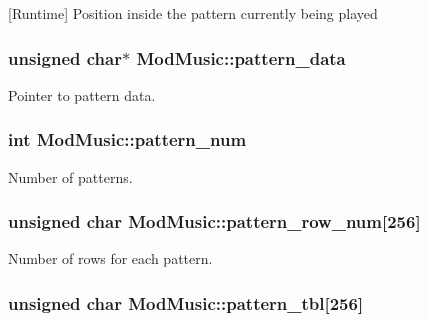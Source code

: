 \mbox{[}Runtime\mbox{]} Position inside the pattern currently being played 

\hypertarget{structModMusic_a4f279f645c007e434d897b480510e748}{}
\subsubsection[{pattern\+\_\+data}]{\setlength{\rightskip}{0pt plus 5cm}unsigned char$\ast$ Mod\+Music\+::pattern\+\_\+data}\label{structModMusic_a4f279f645c007e434d897b480510e748}


Pointer to pattern data. 

\hypertarget{structModMusic_a94311ad25e92db0711cc9dfb5f25103d}{}
\subsubsection[{pattern\+\_\+num}]{\setlength{\rightskip}{0pt plus 5cm}int Mod\+Music\+::pattern\+\_\+num}\label{structModMusic_a94311ad25e92db0711cc9dfb5f25103d}


Number of patterns. 

\hypertarget{structModMusic_a4a84e33e38cc3b0734b3901276e8cf38}{}
\subsubsection[{pattern\+\_\+row\+\_\+num}]{\setlength{\rightskip}{0pt plus 5cm}unsigned char Mod\+Music\+::pattern\+\_\+row\+\_\+num\mbox{[}256\mbox{]}}\label{structModMusic_a4a84e33e38cc3b0734b3901276e8cf38}


Number of rows for each pattern. 

\hypertarget{structModMusic_a48139937a46f8938045f3852dab34b33}{}
\subsubsection[{pattern\+\_\+tbl}]{\setlength{\rightskip}{0pt plus 5cm}unsigned char Mod\+Music\+::pattern\+\_\+tbl\mbox{[}256\mbox{]}}\label{structModMusic_a48139937a46f8938045f3852dab34b33}


